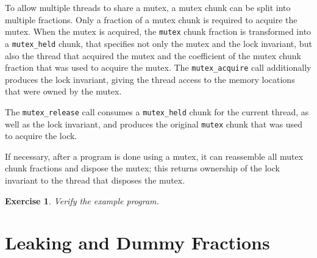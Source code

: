 \documentclass{article}
\newtheorem{exercise}{Exercise}
\begin{document}
To allow multiple threads to share a mutex, a mutex chunk can
be split into multiple fractions. Only a fraction of a mutex
chunk is required to acquire the mutex. When the mutex is
acquired, the \lstinline!mutex! chunk fraction is transformed
into a \lstinline!mutex_held! chunk, that specifies not only
the mutex and the lock invariant, but also the thread that
acquired the mutex and the coefficient of the mutex chunk
fraction that was used to acquire the mutex. The
\lstinline!mutex_acquire! call additionally produces the lock
invariant, giving the thread access to the memory locations
that were owned by the mutex.

The \lstinline!mutex_release! call consumes a
\lstinline!mutex_held! chunk for the current thread, as well as
the lock invariant, and produces the original \lstinline!mutex!
chunk that was used to acquire the lock.

If necessary, after a program is done using a mutex, it can
reassemble all mutex chunk fractions and dispose the mutex;
this returns ownership of the lock invariant to the thread that
disposes the mutex.

\begin{exercise}\label{exercise:mutexes}
Verify the example program.
\end{exercise}

\section{Leaking and Dummy Fractions}\label{section:leaking}
\end{document}

